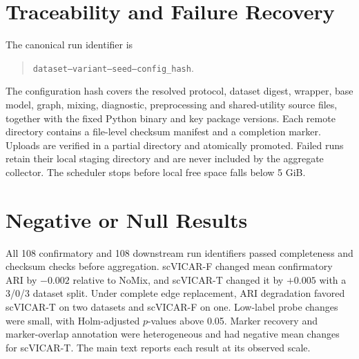 \documentclass[11pt]{article}
\begin{document}
\section{Traceability and Failure Recovery}

The canonical run identifier is
\begin{quote}
\texttt{dataset--variant--seed--config\_hash}.
\end{quote}
The configuration hash covers the resolved protocol, dataset digest, wrapper,
base model, graph, mixing, diagnostic, preprocessing and shared-utility source
files, together with the fixed Python binary and key package versions.  Each
remote directory contains a file-level checksum manifest and a
completion marker.  Uploads are verified in a partial directory and atomically
promoted.  Failed runs retain their local staging directory and are never
included by the aggregate collector.  The scheduler stops before local free
space falls below 5 GiB.

\section{Negative or Null Results}

All 108 confirmatory and 108 downstream run identifiers passed completeness
and checksum checks before aggregation. scVICAR-F changed mean confirmatory
ARI by $-0.002$ relative to NoMix, and scVICAR-T changed it by $+0.005$ with a
3/0/3 dataset split. Under complete edge replacement, ARI degradation favored
scVICAR-T on two datasets and scVICAR-F on one. Low-label probe changes were
small, with Holm-adjusted $p$-values above 0.05. Marker recovery and
marker-overlap annotation were heterogeneous and had negative mean changes for
scVICAR-T. The main text reports each result at its observed scale.
\end{document}
